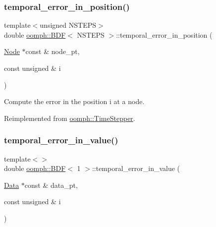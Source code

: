 \subsubsection{\texorpdfstring{temporal\+\_\+error\+\_\+in\+\_\+position()}{temporal\_error\_in\_position()}\hspace{0.1cm}{\footnotesize\ttfamily [4/4]}}
{\footnotesize\ttfamily template$<$unsigned N\+S\+T\+E\+PS$>$ \\
double \hyperlink{classoomph_1_1BDF}{oomph\+::\+B\+DF}$<$ N\+S\+T\+E\+PS $>$\+::temporal\+\_\+error\+\_\+in\+\_\+position (\begin{DoxyParamCaption}\item[{\hyperlink{classoomph_1_1Node}{Node} $\ast$const \&}]{node\+\_\+pt,  }\item[{const unsigned \&}]{i }\end{DoxyParamCaption})\hspace{0.3cm}{\ttfamily [virtual]}}



Compute the error in the position i at a node. 



Reimplemented from \hyperlink{classoomph_1_1TimeStepper_ac463807aff4bcbedd6e8a463c7390536}{oomph\+::\+Time\+Stepper}.

\mbox{\label{classoomph_1_1BDF_a620de844b609fd064f405a5831d1defe}} 
\subsubsection{\texorpdfstring{temporal\+\_\+error\+\_\+in\+\_\+value()}{temporal\_error\_in\_value()}\hspace{0.1cm}{\footnotesize\ttfamily [1/4]}}
{\footnotesize\ttfamily template$<$$>$ \\
double \hyperlink{classoomph_1_1BDF}{oomph\+::\+B\+DF}$<$ 1 $>$\+::temporal\+\_\+error\+\_\+in\+\_\+value (\begin{DoxyParamCaption}\item[{\hyperlink{classoomph_1_1Data}{Data} $\ast$const \&}]{data\+\_\+pt,  }\item[{const unsigned \&}]{i }\end{DoxyParamCaption})\hspace{0.3cm}{\ttfamily [virtual]}}



